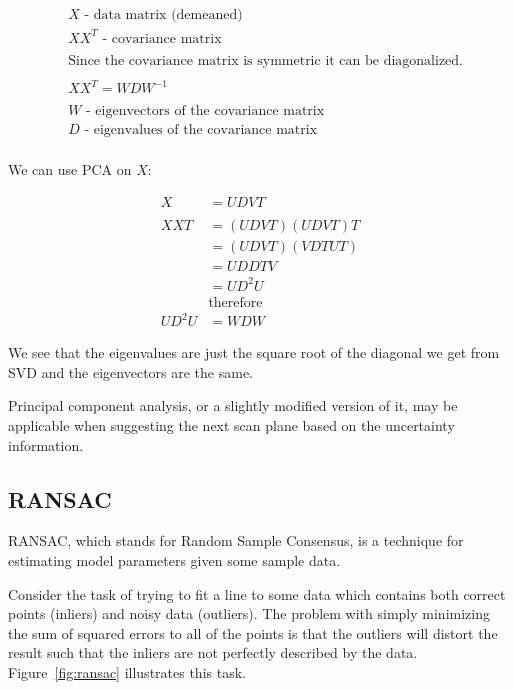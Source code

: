 \documentclass[
  oneside,
  11pt, a4paper,
  footinclude=true,
  headinclude=true,
  cleardoublepage=empty
]{scrbook}
\begin{document}
\begin{align*}
& X \text{ - data matrix (demeaned)} \\
& XX^{T} \text{ - covariance matrix} \\
& \\
& \text{Since the covariance matrix is symmetric it can be diagonalized.} \\
& \\
& XX^{T} = WDW^{-1} \\
& \\
& W \text{ - eigenvectors of the covariance matrix} \\
& D \text{ - eigenvalues of the covariance matrix} \\
\end{align*}

We can use PCA on $X$:

\begin{align*}
X &= UDVT \\
& \\
XXT &= (UDVT)(UDVT)T \\
	&= (UDVT)(VDTUT) \\
	&= UDDTV \\
	&= UD^{2}U \\
	& \text{therefore} \\
UD^{2}U &= WDW
\end{align*}

We see that the eigenvalues are just the square root of the diagonal we get from SVD and the eigenvectors are the same.

Principal component analysis, or a slightly modified version of it, may be applicable when suggesting the next scan plane based on the uncertainty information.

\newpage
\subsection{RANSAC}
RANSAC, which stands for Random Sample Consensus, is a technique for estimating model parameters given some sample data.

Consider the task of trying to fit a line to some data which contains both correct points (inliers) and noisy data (outliers). The problem with simply minimizing the sum of squared errors to all of the points is that the outliers will distort the result such that the inliers are not perfectly described by the data. Figure~\ref{fig:ransac} illustrates this task.
\end{document}

